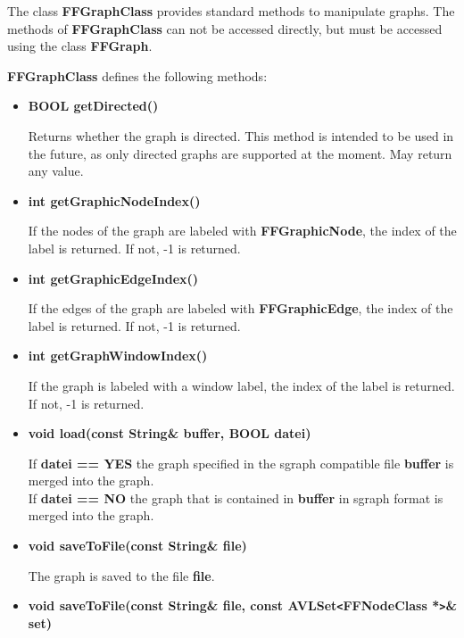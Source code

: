 The class {\bf FFGraphClass} provides standard methods to
manipulate graphs. The methods of {\bf FFGraphClass} can not be
accessed directly, but must be accessed using the class {\bf
  FFGraph}.

{\bf FFGraphClass} defines the following methods:

\begin{itemize}

\item{\bf BOOL getDirected()}
  
  Returns whether the graph is directed. This method is intended
  to be used in the future, as only directed graphs are supported
  at the moment. May return any value.

\item{\bf int getGraphicNodeIndex()}
  
  If the nodes of the graph are labeled with {\bf FFGraphicNode},
  the index of the label is returned. If not, -1 is returned.

\item{\bf int getGraphicEdgeIndex()}
  
  If the edges of the graph are labeled with {\bf FFGraphicEdge},
  the index of the label is returned. If not, -1 is returned.

\item{\bf int getGraphWindowIndex()}
  
  If the graph is labeled with a window label, the index of the
  label is returned. If not, -1 is returned.
 
  
\item{\bf void load(const String\& buffer, BOOL datei)}
  
  If {\bf datei == YES} the graph specified in the sgraph
  compatible file {\bf buffer}
  is merged into the graph.\\
  If {\bf datei == NO} the graph that is contained in {\bf
    buffer} in sgraph format is merged into the graph.

\item{\bf void saveToFile(const String\& file)}
  
  The graph is saved to the file {\bf file}.
  
\item{\bf void saveToFile(const String\& file, const
    AVLSet\verb|<|FFNodeClass *\verb|>|\& set)}
  

\end{itemize}
